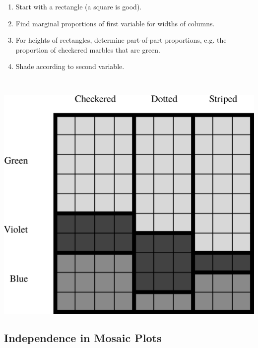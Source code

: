 \begin{frame}
\small
\begin{enumerate}
\item Start with a rectangle (a square is good).
\item Find marginal proportions of first variable for widths of columns.
\item For heights of rectangles, determine part-of-part proportions, e.g. the proportion of checkered marbles that are green.
\item Shade according to second variable.
\end{enumerate}
\\ \vfill
\begin{center}
\includegraphics[scale=0.3]{1-7_categorical_data/figures/mosaic/shaded.png}
\end{center}
\end{frame}


\subsection{Independence in Mosaic Plots}



